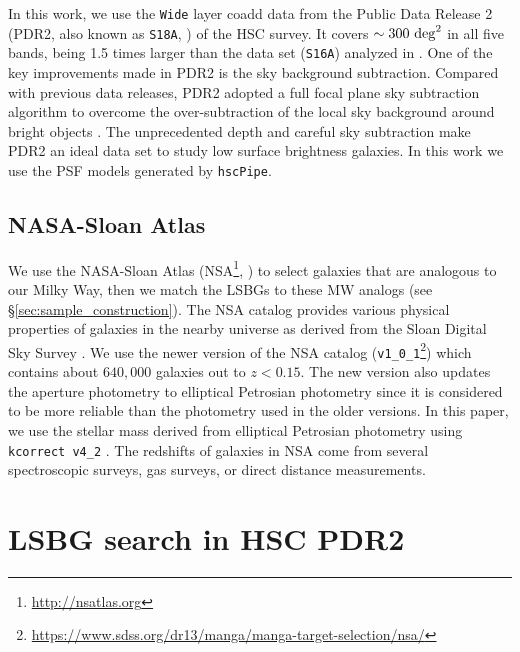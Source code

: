 \documentclass[twocolumn,astrosymb,twocolappendix]{aastex631}
\newcommand{\code}[1]{\texttt{#1}}
\begin{document}
\begin{CJK*}{UTF8}{gbsn}
In this work, we use the \code{Wide} layer coadd data from the Public Data Release 2 (PDR2, also known as \code{S18A}, \citealt{Aihara2018}) of the HSC survey. It covers $\sim 300\ \rm{deg}^2$ in all five bands, being 1.5 times larger than the data set (\code{S16A}) analyzed in \citet{Greco2018}. One of the key improvements made in PDR2 is the sky background subtraction. Compared with previous data releases, PDR2 adopted a full focal plane sky subtraction algorithm to overcome the over-subtraction of the local sky background around bright objects \citep{Aihara2018,Li2021}. The unprecedented depth and careful sky subtraction make PDR2 an ideal data set to study low surface brightness galaxies. In this work we use the PSF models generated by \code{hscPipe}. 


\subsection{NASA-Sloan Atlas}
We use the NASA-Sloan Atlas (NSA\footnote{\url{http://nsatlas.org}}, \citealt{Blanton2005,Blanton2011}) to select galaxies that are analogous to our Milky Way, then we match the LSBGs to these MW analogs (see \S \ref{sec:sample_construction}). The NSA catalog provides various physical properties of galaxies in the nearby universe as derived from the Sloan Digital Sky Survey \citep[SDSS,][]{York2000}. We use the newer version of the NSA catalog (\code{v1\_0\_1}\footnote{\url{https://www.sdss.org/dr13/manga/manga-target-selection/nsa/}}) which contains about $640,000$ galaxies out to $z < 0.15$. The new version also updates the aperture photometry to elliptical Petrosian photometry since it is considered to be more reliable than the photometry used in the older versions. In this paper, we use the stellar mass derived from elliptical Petrosian photometry using \code{kcorrect v4\_2} \citep{Blanton2007}. The redshifts of galaxies in NSA come from several spectroscopic surveys,  gas surveys, or direct distance measurements. 

\section{LSBG search in HSC PDR2}\label{sec:lsbg_search}


\end{CJK*}
\end{document}
